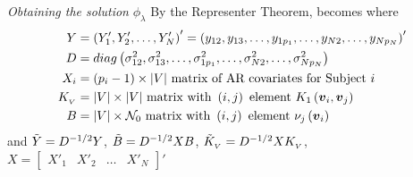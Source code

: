 \begin{frame}{\textit{Obtaining the solution}  $\phi_\lambda$}
\footnotesize
By the Representer Theorem, \nt{\eqref{eq:phi-penalized-sums-of-squares}} becomes
\footnotesize
where
\begin{align*}%
Y&= \left( Y'_1, Y'_2, \dots, Y'_{N} \right)' = \left( y_{12}, y_{13},\dots, y_{1p_1}, \dots, y_{N2},\dots, y_{Np_N} \right)'\\
D &= diag\left( \sigma^2_{12}, \sigma^2_{13},\dots, \sigma^2_{1p_1}, \dots,\sigma^2_{N2},\dots, \sigma^2_{Np_N}  \right)\\
X_i &= \left(p_i-1\right) \times \vert V \vert \mbox{ matrix of AR covariates for Subject }i \\
K_{_{ V}} &= \vert V \vert \times \vert V \vert \mbox{ matrix with } \left(i,j\right) \mbox{ element } K_1\left(\bfv_i, \bfv_j\right)\\
B &= \vert V \vert \times \mathcal{N}_0 \mbox{ matrix with } \left(i,j\right) \mbox{ element } \nu_j\left(\bfv_i\right)
\end{align*} \footnotesize
and $\tilde{Y} = D^{-1/2} Y$, $\tilde{B} = D^{-1/2} X B $, $\tilde{K}_{_{ V}} = D^{-1/2} X K_{_{ V}}$, $X = \begin{bmatrix} X'_1 & X'_2 & \dots & X'_N \end{bmatrix}'$ 
\end{frame}


